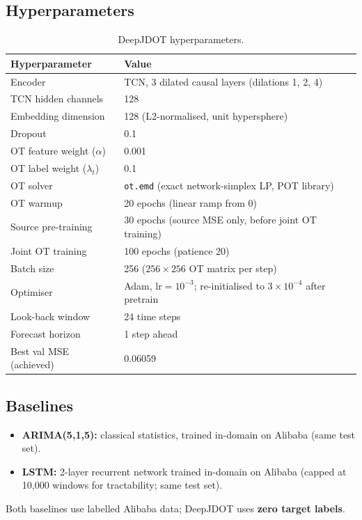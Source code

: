\documentclass[12pt,a4paper]{article}
\begin{document}
\subsection{Hyperparameters}

\begin{table}[H]
\centering
\small
\caption{DeepJDOT hyperparameters.}
\begin{tabular}{@{}ll@{}}
\toprule
\textbf{Hyperparameter} & \textbf{Value} \\
\midrule
Encoder & TCN, 3 dilated causal layers (dilations 1, 2, 4) \\
TCN hidden channels & 128 \\
Embedding dimension & 128 (L2-normalised, unit hypersphere) \\
Dropout & 0.1 \\
OT feature weight ($\alpha$) & 0.001 \\
OT label weight ($\lambda_t$) & 0.1 \\
OT solver & \texttt{ot.emd} (exact network-simplex LP, POT library) \\
OT warmup & 20 epochs (linear ramp from 0) \\
Source pre-training & 30 epochs (source MSE only, before joint OT training) \\
Joint OT training & 100 epochs (patience 20) \\
Batch size & 256 ($256{\times}256$ OT matrix per step) \\
Optimiser & Adam, $\mathrm{lr}=10^{-3}$; re-initialised to $3{\times}10^{-4}$ after pretrain \\
Look-back window & 24 time steps \\
Forecast horizon & 1 step ahead \\
Best val MSE (achieved) & 0.06059 \\
\bottomrule
\end{tabular}
\end{table}

\subsection{Baselines}

\begin{itemize}
  \item \textbf{ARIMA(5,1,5):} classical statistics, trained in-domain on Alibaba (same test set).
  \item \textbf{LSTM:} 2-layer recurrent network trained in-domain on Alibaba
        (capped at 10,000 windows for tractability; same test set).
\end{itemize}
Both baselines use labelled Alibaba data; DeepJDOT uses \textbf{zero target labels}.
\end{document}
